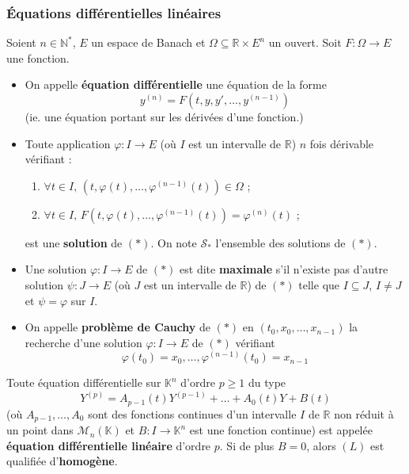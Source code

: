   \subsubsection{Équations différentielles linéaires}


  \begin{definition}
    Soient $n \in \mathbb{N}^*$, $E$ un espace de Banach et $\Omega \subseteq \mathbb{R} \times E^n$ un ouvert. Soit $F : \Omega \rightarrow E$ une fonction.
    \begin{itemize}
      \item On appelle \textbf{équation différentielle} une équation de la forme
      \[ y^{(n)} = F(t, y, y', \dots, y^{(n-1)}) \tag{$*$} \]
      (ie. une équation portant sur les dérivées d'une fonction.)
      \item Toute application $\varphi : I \rightarrow E$ (où $I$ est un intervalle de $\mathbb{R}$) $n$ fois dérivable vérifiant :
      \begin{enumerate}[label={\bfseries(\roman*)}]
        \item $\forall t \in I, \, (t, \varphi(t), \dots, \varphi^{(n-1)}(t)) \in \Omega$ ;
        \item $\forall t \in I, \, F(t, \varphi(t), \dots, \varphi^{(n-1)}(t)) = \varphi^{(n)}(t)$ ;
      \end{enumerate}
      est une \textbf{solution} de $(*)$. On note $\mathcal{S}_*$ l'ensemble des solutions de $(*)$.
      \item Une solution $\varphi : I \rightarrow E$ de $(*)$ est dite \textbf{maximale} s'il n'existe pas d'autre solution $\psi : J \rightarrow E$ (où $J$ est un intervalle de $\mathbb{R}$) de $(*)$ telle que $I \subseteq J$, $I \neq J$ et $\psi = \varphi$ sur $I$.
      \item On appelle \textbf{problème de Cauchy} de $(*)$ en $(t_0, x_0, \dots, x_{n-1})$ la recherche d'une solution $\varphi : I \rightarrow E$ de $(*)$ vérifiant
      \[ \varphi(t_0) = x_0, \dots, \varphi^{(n-1)}(t_0) = x_{n-1} \]
    \end{itemize}
  \end{definition}


  \begin{definition}
    Toute équation différentielle sur $\mathbb{K}^n$ d'ordre $p \geq 1$ du type
    \[ Y^{(p)} = A_{p-1}(t) Y^{(p-1)} + \dots + A_0(t) Y + B(t) \tag{$L$} \]
    (où $A_{p-1}, \dots, A_0$ sont des fonctions continues d'un intervalle $I$ de $\mathbb{R}$ non réduit à un point dans $\mathcal{M}_n(\mathbb{K})$ et $B : I \rightarrow \mathbb{K}^n$ est une fonction continue) est appelée \textbf{équation différentielle linéaire} d'ordre $p$.
    \newpar
    Si de plus $B = 0$, alors $(L)$ est qualifiée d'\textbf{homogène}.
  \end{definition}

